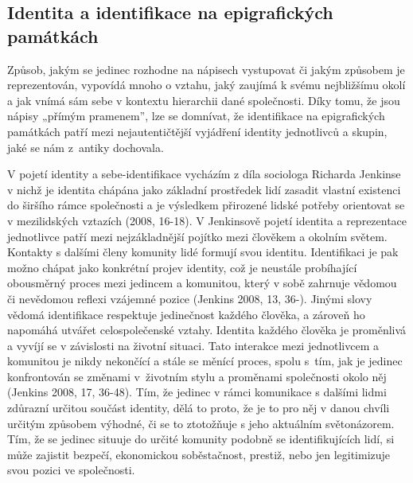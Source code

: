 \subsection[identita-a-identifikace-na-epigrafických-památkách]{Identita a identifikace na epigrafických památkách}

Způsob, jakým se jedinec rozhodne na nápisech vystupovat či jakým způsobem je reprezentován, vypovídá mnoho o vztahu, jaký zaujímá k svému nejbližšímu okolí a jak vnímá sám sebe v kontextu hierarchii dané společnosti. Díky tomu, že jsou nápisy „přímým pramenem”, lze se domnívat, že identifikace na epigrafických památkách patří mezi nejautentičtější vyjádření identity jednotlivců a skupin, jaké se nám z~antiky dochovala.

V pojetí identity a sebe-identifikace vycházím z díla sociologa Richarda Jenkinse v nichž je identita chápána jako základní prostředek lidí zasadit vlastní existenci do širšího rámce společnosti a je výsledkem přirozené lidské potřeby orientovat se v mezilidských vztazích (2008, 16-18). V Jenkinsově pojetí identita a reprezentace jednotlivce patří mezi nejzákladnější pojítko mezi člověkem a okolním světem. Kontakty s dalšími členy komunity lidé formují svou identitu. Identifikaci je pak možno chápat jako konkrétní projev identity, což je neustále probíhající obousměrný proces mezi jedincem a komunitou, který v sobě zahrnuje vědomou či nevědomou reflexi vzájemné pozice (Jenkins 2008, 13, 36-). Jinými slovy vědomá identifikace respektuje jedinečnost každého člověka, a zároveň ho napomáhá utvářet celospolečenské vztahy. Identita každého člověka je proměnlivá a vyvíjí se v závislosti na životní situaci. Tato interakce mezi jednotlivcem a komunitou je nikdy nekončící a stále se měnící proces, spolu s~tím, jak je jedinec konfrontován se změnami v~životním stylu a proměnami společnosti okolo něj (Jenkins 2008, 17, 36-48). Tím, že jedinec v rámci komunikace s dalšími lidmi zdůrazní určitou součást identity, dělá to proto, že je to pro něj v danou chvíli určitým způsobem výhodné, či se to ztotožňuje s jeho aktuálním světonázorem. Tím, že se jedinec situuje do určité komunity podobně se identifikujících lidí, si může zajistit bezpečí, ekonomickou soběstačnost, prestiž, nebo jen legitimizuje svou pozici ve společnosti.

